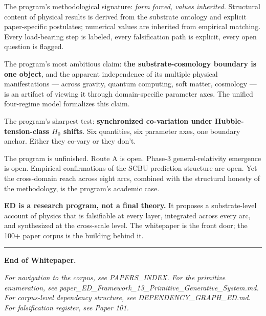 \documentclass[11pt,a4paper]{article}
\begin{document}
The program's methodological signature: \emph{form forced, values inherited.} Structural content of physical results is derived from the substrate ontology and explicit paper-specific postulates; numerical values are inherited from empirical matching. Every load-bearing step is labeled, every falsification path is explicit, every open question is flagged.

The program's most ambitious claim: \textbf{the substrate-cosmology boundary is one object}, and the apparent independence of its multiple physical manifestations --- across gravity, quantum computing, soft matter, cosmology --- is an artifact of viewing it through domain-specific parameter axes. The unified four-regime model formalizes this claim.

The program's sharpest test: \textbf{synchronized co-variation under Hubble-tension-class $H_0$ shifts}. Six quantities, six parameter axes, one boundary anchor. Either they co-vary or they don't.

The program is unfinished. Route A is open. Phase-3 general-relativity emergence is open. Empirical confirmations of the SCBU prediction structure are open. Yet the cross-domain reach across eight arcs, combined with the structural honesty of the methodology, is the program's academic case.

\textbf{ED is a research program, not a final theory.} It proposes a substrate-level account of physics that is falsifiable at every layer, integrated across every arc, and synthesized at the cross-scale level. The whitepaper is the front door; the 100+ paper corpus is the building behind it.

\vspace{1em}
\hrule
\vspace{1em}

\textbf{End of Whitepaper.}

\textit{For navigation to the corpus, see PAPERS\_INDEX. For the primitive enumeration, see paper\_ED\_Framework\_13\_Primitive\_Generative\_System.md. For corpus-level dependency structure, see DEPENDENCY\_GRAPH\_ED.md. For falsification register, see Paper 101.}
\end{document}
